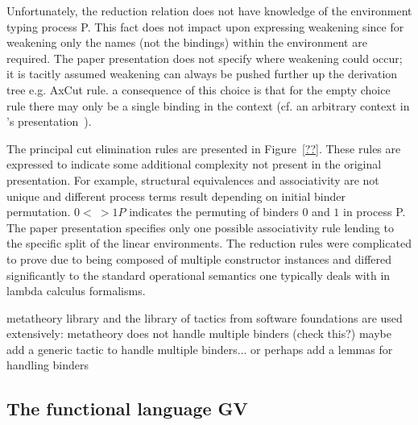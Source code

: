 
Unfortunately, the reduction relation does not have knowledge of the
environment typing process P. This fact does not impact upon expressing
weakening since for weakening only the names (not the bindings) within the
environment are required. The paper presentation does not specify where
weakening could occur; it is tacitly assumed weakening can always be pushed
further up the derivation tree e.g. AxCut rule. a consequence of this choice
is that for the empty choice rule there may only be a single binding in the
context (cf. an arbitrary context in \citeauthor{Wadler:2014}'s
presentation~\cite{Wadler:2014}).




The principal cut elimination rules are presented in Figure~\ref{??}. These
rules are expressed to indicate some additional complexity not present in the
original presentation. For example, structural equivalences and associativity
are not unique and different process terms result depending on initial binder
permutation. ${0 <~> 1}P$ indicates the permuting of binders $0$ and $1$ in
process P. The paper presentation specifies only one possible associativity
rule lending to the specific split of the linear environments. The reduction
rules were complicated to prove due to being composed of multiple constructor
instances and differed significantly to the standard operational semantics one
typically deals with in lambda calculus formalisms.







metatheory library and the library of tactics from software foundations are
used extensively: metatheory does not handle multiple binders (check this?)
maybe add a generic tactic to handle multiple binders... or perhaps add a
lemmas for handling binders

\subsection{The functional language GV}\label{sec:gv}


